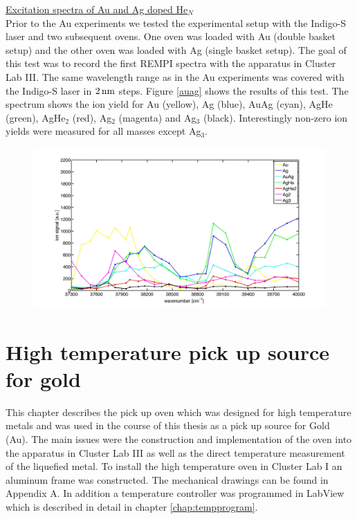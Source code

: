 \documentclass[parskip,12pt,headsepline,a4paper] {scrbook}
\begin{document}
\newpage

\underline{Excitation spectra of Au and Ag doped He$_N$} \\
Prior to the Au experiments we tested the experimental setup with the Indigo-S laser and two subsequent ovens. One oven was loaded with Au (double basket setup) and the other oven was loaded with Ag (single basket setup). The goal of this test was to record the first REMPI spectra with the apparatus in Cluster Lab III. The same wavelength range as in the Au experiments was covered with the Indigo-S laser in $\unit[2]{nm}$ steps. Figure \ref{auag} shows the results of this test. The spectrum shows the ion yield for Au (yellow), Ag (blue), AuAg (cyan), AgHe (green), AgHe$_2$ (red), Ag$_2$ (magenta) and Ag$_3$ (black). Interestingly non-zero ion yields were measured for all masses except Ag$_3$.

\begin{figure}[ht]
\centerline{
\includegraphics[width=19cm]{./results/au_ag_spec.jpg}}
\end{figure}


\chapter{High temperature pick up source for gold}
\label{chap:goldoven}
This chapter describes the pick up oven which was designed for high temperature metals and was used in the course of this thesis as a pick up source for Gold (Au). The main issues were the construction and implementation of the oven into the apparatus in Cluster Lab III as well as the direct temperature measurement of the liquefied metal. To install the high temperature oven in Cluster Lab I an aluminum frame was constructed. The mechanical drawings can be found in Appendix A. In addition a temperature controller was programmed in LabView which is described in detail in chapter \ref{chap:tempprogram}.
\end{document}
